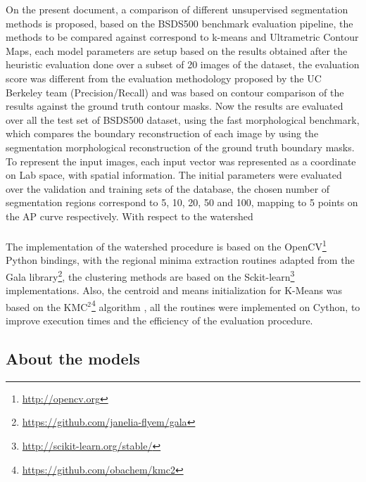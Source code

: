 \documentclass[10pt,twocolumn,letterpaper]{article}
\begin{document}
On the present document, a comparison of different unsupervised segmentation methods is proposed, based on  the BSDS500 benchmark evaluation pipeline, the methods to be compared against correspond to k-means and Ultrametric Contour Maps, each model parameters are setup based on the results obtained after the heuristic evaluation done over a subset of 20 images of the dataset, the evaluation score was different from the evaluation methodology proposed by the UC Berkeley team (Precision/Recall) and was based on contour comparison of the results against the ground truth contour masks. Now the results are evaluated over all the test set of BSDS500 dataset, using the fast morphological benchmark, which compares the boundary reconstruction of each image by using the segmentation morphological reconstruction of the ground truth boundary masks. To represent the input images, each input vector was represented as a coordinate on Lab space, with spatial information. The initial parameters were evaluated over the validation and training sets of the database, the chosen number of segmentation regions correspond to 5, 10, 20, 50 and 100, mapping to 5 points on the AP curve respectively. With respect to the watershed    
\\
\\
The implementation of the watershed procedure is based on the OpenCV\footnote{\url{http://opencv.org}} Python bindings, with the regional minima extraction routines adapted from the Gala library\footnote{\url{https://github.com/janelia-flyem/gala}}, the clustering methods are based on the Sckit-learn\footnote{\url{http://scikit-learn.org/stable/}} implementations. Also, the centroid and means initialization for K-Means was based on the KMC$^{2}$\footnote{\url{https://github.com/obachem/kmc2}} algorithm \cite{Bachem:2016:AKS:3016100.3016103}, all the routines were implemented on Cython, to improve execution times and the efficiency of the evaluation procedure.



\subsection*{About the models}
\end{document}

